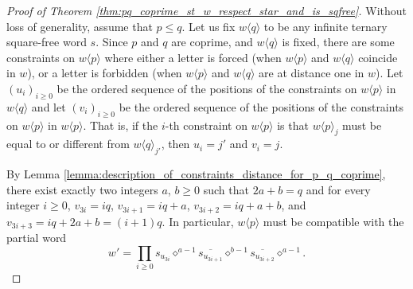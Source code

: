 \documentclass[12pt]{article}
\theoremstyle{definition}
\newcommand{\subsequence}[2]{#1\langle#2\rangle}
\begin{document}
\begin{proof}[Proof of Theorem \ref{thm:pq_coprime_st_w_respect_star_and_is_sqfree}]
    Without loss of generality, assume that $p \le q$.
    Let us fix $\subsequence{w}{q}$ to be any infinite ternary square-free word $s$. Since $p$ and $q$ are coprime, and $\subsequence{w}{q}$ is fixed, there are some constraints on $\subsequence{w}{p}$ where either a letter is forced (when $\subsequence{w}{p}$ and $\subsequence{w}{q}$ coincide in $w$), or a letter is forbidden (when $\subsequence{w}{p}$ and $\subsequence{w}{q}$ are at distance one in $w$). 
    Let $(u_i)_{i \ge 0}$ be the ordered sequence of the positions of the constraints on $\subsequence{w}{p}$ in $\subsequence{w}{q}$ and let $(v_i)_{i \ge 0}$ be the ordered sequence of the positions of the constraints on $\subsequence{w}{p}$ in $\subsequence{w}{p}$. That is, if the $i$-th constraint on $\subsequence{w}{p}$ is that ${\subsequence{w}{p}}_j$ must be equal to or different from ${\subsequence{w}{q}}_{j'}$, then $u_i = j'$ and $v_i = j$.
    
    By Lemma \ref{lemma:description_of_constraints_distance_for_p_q_coprime}, there exist exactly two integers $a$, $b \ge 0$ such that $2a + b = q$ and for every integer $i \ge 0$, $v_{3i} = iq$, $v_{3i + 1} = iq + a$, $v_{3i + 2} = iq + a + b$, and $v_{3i + 3} = iq + 2a + b = (i + 1)q$. 
    In particular, $\subsequence{w}{p}$ must be compatible with the partial word 
    $$w' = \prod_{i\ge0}s_{u_{3i}}\diamond^{a - 1}\overline{s_{u_{3i + 1}}}\diamond^{b - 1}\overline{s_{u_{3i + 2}}}\diamond^{a - 1}.$$ 
    

\end{proof}
\end{document}
